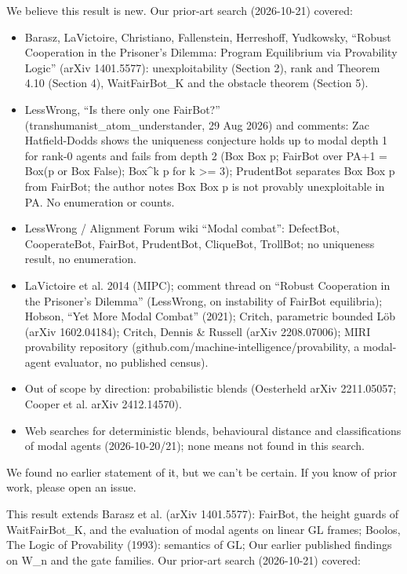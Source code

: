 \documentclass{article}
\begin{document}
We believe this result is new. Our prior-art search (2026-10-21) covered:

\begin{itemize}
\item Barasz, LaVictoire, Christiano, Fallenstein, Herreshoff, Yudkowsky, ``Robust Cooperation in the Prisoner's Dilemma: Program Equilibrium via Provability Logic'' (arXiv 1401.5577): unexploitability (Section 2), rank and Theorem 4.10 (Section 4), WaitFairBot\_K and the obstacle theorem (Section 5).
\item LessWrong, ``Is there only one FairBot?'' (transhumanist\_atom\_understander, 29 Aug 2026) and comments: Zac Hatfield-Dodds shows the uniqueness conjecture holds up to modal depth 1 for rank-0 agents and fails from depth 2 (Box Box p; FairBot over PA+1 = Box(p or Box False); Box\textasciicircum{}k p for k \textgreater{}= 3); PrudentBot separates Box Box p from FairBot; the author notes Box Box p is not provably unexploitable in PA. No enumeration or counts.
\item LessWrong / Alignment Forum wiki ``Modal combat'': DefectBot, CooperateBot, FairBot, PrudentBot, CliqueBot, TrollBot; no uniqueness result, no enumeration.
\item LaVictoire et al. 2014 (MIPC); comment thread on ``Robust Cooperation in the Prisoner's Dilemma'' (LessWrong, on instability of FairBot equilibria); Hobson, ``Yet More Modal Combat'' (2021); Critch, parametric bounded Löb (arXiv 1602.04184); Critch, Dennis \& Russell (arXiv 2208.07006); MIRI provability repository (github.com/machine-intelligence/provability, a modal-agent evaluator, no published census).
\item Out of scope by direction: probabilistic blends (Oesterheld arXiv 2211.05057; Cooper et al. arXiv 2412.14570).
\item Web searches for deterministic blends, behavioural distance and classifications of modal agents (2026-10-20/21); none means not found in this search.
\end{itemize}

We found no earlier statement of it, but we can't be certain. If you know of prior work, please open an issue.

This result extends Barasz et al. (arXiv 1401.5577): FairBot, the height guards of WaitFairBot\_K, and the evaluation of modal agents on linear GL frames; Boolos, The Logic of Provability (1993): semantics of GL; Our earlier published findings on W\_n and the gate families. Our prior-art search (2026-10-21) covered:
\end{document}
